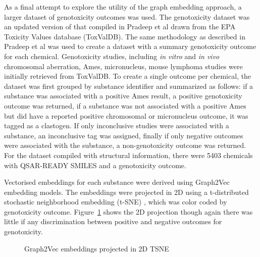 \documentclass[
  super,
  preprint,
  3p]{elsarticle}
\begin{document}
As a final attempt to explore the utility of the graph embedding
approach, a larger dataset of genotoxicity outcomes was used. The
genotoxicity dataset was an updated version of that compiled in Pradeep
et al \citep{pradeep_evaluation_2021} drawn from the EPA Toxicity Values
database (ToxValDB). The same methodology as described in Pradeep et al
\citep{pradeep_evaluation_2021} was used to create a dataset with a
summary genotoxicity outcome for each chemical. Genotoxicity studies,
including \emph{in vitro} and \emph{in vivo} chromosomal aberration,
Ames, micronucleus, mouse lymphoma studies were initially retrieved from
ToxValDB. To create a single outcome per chemical, the dataset was first
grouped by substance identifier and summarized as follows: if a
substance was associated with a positive Ames result, a positive
genotoxicity outcome was returned, if a substance was not associated
with a positive Ames but did have a reported positive chromosomal or
micronucleus outcome, it was tagged as a clastogen. If only inconclusive
studies were associated with a substance, an inconclusive tag was
assigned, finally if only negative outcomes were associated with the
substance, a non-genotoxicity outcome was returned. For the dataset
compiled with structural information, there were 5403 chemicals with
QSAR-READY SMILES and a genotoxicity outcome.

Vectorised embeddings for each substance were derived using Graph2Vec
embedding models. The embeddings were projected in 2D using a
t-distributed stochastic neighborhood embedding (t-SNE)
\citep{van_er_maaten_visualizing_2018}, which was color coded by
genotoxicity outcome. Figure~\ref{fig-g2vgene} shows the 2D projection
though again there was little if any discrimination between positive and
negative outcomes for genotoxicity.

\begin{figure}


\caption{\label{fig-g2vgene}Graph2Vec embeddings projected in 2D TSNE}

\end{figure}%
\end{document}
